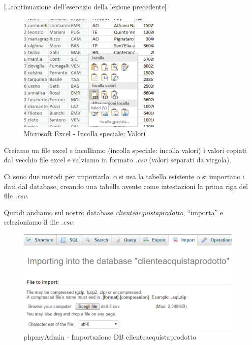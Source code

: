 [\dots continuazione dell’esercizio della lezione precedente] 

\begin{center}
\begin{figure}[H]
\centering
\includegraphics[scale=1]{figures/excel_pasteval.png}
\caption{Microsoft Excel - Incolla speciale: Valori} 
\end{figure}
\end{center}

Creiamo un file excel e incolliamo (incolla speciale: incolla valori) i valori copiati dal vecchio file excel e salviamo in formato \textit{.csv} (valori separati da virgola).

Ci sono due metodi per importarlo: o si usa la tabella esistente o si importano i dati dal database, creando una tabella avente come intestazioni la prima riga del file \textit{.csv}.

Quindi andiamo sul nostro database \textit{clienteacquistaprodotto}, “importa” e selezioniamo il file \textit{.csv}:

\begin{center}
\begin{figure}[H]
\centering
\includegraphics[scale=1]{figures/clienteacquistaprodotto_import.png}
\caption{phpmyAdmin - Importazione DB clienteacquistaprodotto} 
\end{figure}
\end{center}

